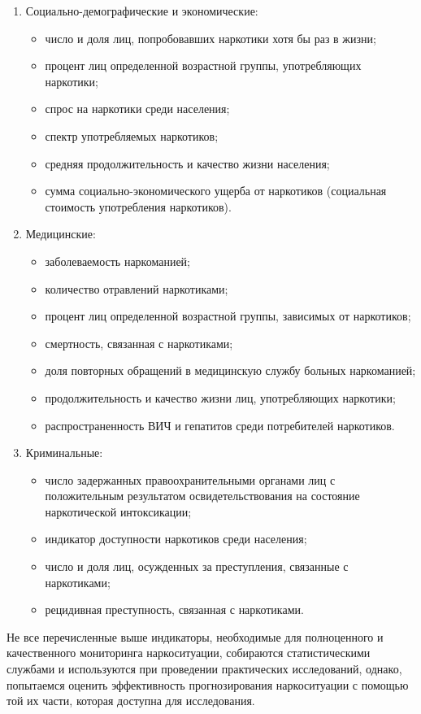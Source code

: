 \documentclass[a4paper,14pt]{article}
\begin{document}
	\begin{enumerate}		
	\item Социально-демографические и экономические:
	\begin{itemize}
	\item число и доля лиц, попробовавших наркотики хотя бы раз в жизни;
	\item процент лиц определенной возрастной группы, употребляющих наркотики;
	\item спрос на наркотики среди населения;
	\item спектр употребляемых наркотиков;
	\item средняя продолжительность и качество жизни населения;
	\item сумма социально-экономического ущерба от наркотиков (социальная стоимость употребления наркотиков).
	\end{itemize}
	\item Медицинские:
	\begin{itemize}
	\item заболеваемость наркоманией;
	\item количество отравлений наркотиками;
	\item процент лиц определенной возрастной группы, зависимых от наркотиков;
	\item смертность, связанная с наркотиками;
	\item доля повторных обращений в медицинскую службу больных наркоманией;
	\item продолжительность и качество жизни лиц, употребляющих наркотики;
	\item распространенность ВИЧ и гепатитов среди потребителей наркотиков.
	\end{itemize}
	
	\item Криминальные:
	\begin{itemize}
	\item число задержанных правоохранительными органами лиц с положительным результатом освидетельствования на состояние наркотической интоксикации;
	\item индикатор доступности наркотиков среди населения;
	\item число и доля лиц, осужденных за преступления, связанные с наркотиками;
	\item рецидивная преступность, связанная с наркотиками.
	\end{itemize}
	\end{enumerate}
	
	Не все перечисленные выше индикаторы, необходимые для полноценного и качественного мониторинга наркоситуации, собираются статистическими службами и используются при проведении практических исследований, однако, попытаемся оценить эффективность прогнозирования наркоситуации с помощью той их части, которая доступна для исследования.
	
\end{document}
